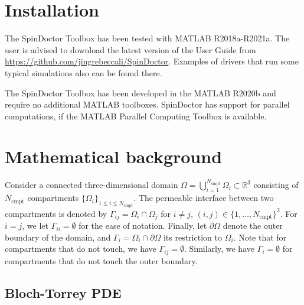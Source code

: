 \documentclass[a4paper]{article}
\begin{document}
\section{Installation}

The SpinDoctor Toolbox has been tested with MATLAB R2018a-R2021a. The user is advised to download the latest version of the User Guide from \url{https://github.com/jingrebeccali/SpinDoctor}. Examples of drivers that run some typical simulations also can be found there.

The SpinDoctor Toolbox has been developed in the MATLAB R2020b and require no additional MATLAB toolboxes. SpinDoctor has support for parallel computations, if the MATLAB Parallel Computing Toolbox is available.


\section{Mathematical background}

Consider a connected three-dimensional domain $\Omega = \bigcup_{i = 1}^{N_\text{cmpt}} \Omega_i \subset \mathbb{R}^3$ consisting of $N_\text{cmpt}$ compartments $\{\Omega_i\}_{1 \leq i \leq N_\text{cmpt}}$. The permeable interface between two compartments is denoted by $\Gamma_{i j} = \Omega_i \cap \Omega_j$ for $i \neq j$, $(i, j) \in \{1, \dots, N_\text{cmpt}\}^2$. For $i = j$, we let $\Gamma_{ii} = \emptyset$ for the ease of notation. Finally, let $\partial \Omega$ denote the outer boundary of the domain, and $\Gamma_i = \Omega_i \cap \partial \Omega$ its restriction to $\Omega_i$. Note that for compartments that do not touch, we have $\Gamma_{i j} = \emptyset$. Similarly, we have $\Gamma_i = \emptyset$ for compartments that do not touch the outer boundary.


\subsection{Bloch-Torrey PDE}
\end{document}
